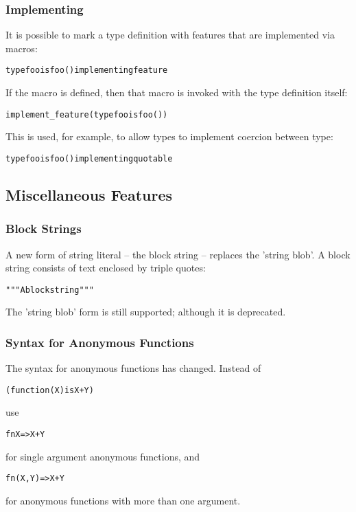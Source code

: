 \subsubsection{Implementing}
It is possible to mark a type definition with  features that are implemented via macros:
\begin{alltt}
type foo is foo() implementing feature
\end{alltt}
If the macro  is defined, then that macro is invoked with the type definition itself:
\begin{alltt}
implement\_feature(type foo is foo())
\end{alltt}
This is used, for example, to allow types to implement coercion between  type:
\begin{alltt}
type foo is foo() implementing quotable
\end{alltt}

\subsection{Miscellaneous Features}

\subsubsection{Block Strings}
A new form of string literal -- the block string -- replaces the 'string blob'. A block string consists of text enclosed by triple quotes:
\begin{alltt}
"""A block string"""
\end{alltt}

\begin{aside}
The 'string blob' form is still supported; although it is deprecated.
\end{aside}

\subsubsection{Syntax for Anonymous Functions}
The syntax for anonymous functions has changed. Instead of
\begin{alltt}
(function(X) is X+Y)
\end{alltt}
use 
\begin{alltt}
fn X=>X+Y
\end{alltt}
for single argument anonymous functions, and
\begin{alltt}
fn(X,Y) => X+Y
\end{alltt}
for anonymous functions with more than one argument.

